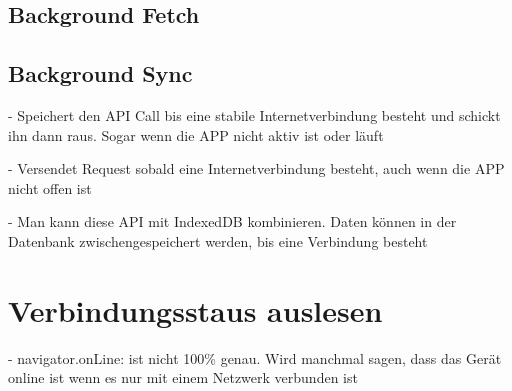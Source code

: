 \subsection{Background Fetch}

\subsection{Background Sync}

- Speichert den API Call bis eine stabile Internetverbindung besteht und schickt ihn dann raus. Sogar wenn die APP nicht aktiv ist oder läuft \autocite{Sheppard2017}

- Versendet Request sobald eine Internetverbindung besteht, auch wenn die APP nicht offen ist \autocite{Rojas2020}

- Man kann diese API mit IndexedDB kombinieren. Daten können in der Datenbank zwischengespeichert werden, bis eine Verbindung besteht \autocite{Rojas2020}

\section{Verbindungsstaus auslesen}

- navigator.onLine: ist nicht 100\% genau. Wird manchmal sagen, dass das Gerät online ist wenn es nur mit einem Netzwerk verbunden ist \autocite{Sheppard2017}


